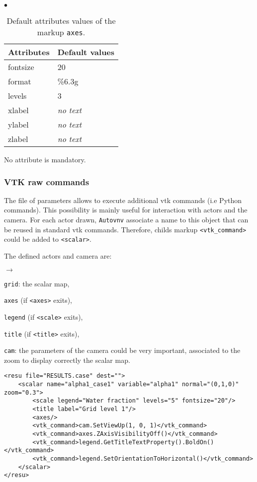 \documentclass[a4paper,10pt,twoside]{csshortdoc}
\begin{document}
\begin{list}{$\bullet$}{}
\begin{table}[htbp]
\begin{center}
\begin{tabular}{|l|l|}
\hline
\textbf{Attributes} & \textbf{Default values} \\
\hline
fontsize & 20 \\
format & \%6.3g \\
levels & 3 \\
xlabel & \textit{no text} \\
ylabel & \textit{no text} \\
zlabel & \textit{no text} \\
\hline
\end{tabular}
\end{center}
\caption{Default attributes values of the markup \texttt{axes}.}
\label{table:axes}
\end{table}

No attribute is mandatory.

\end{list}

\subsubsection{VTK raw commands}\label{sec:raw_vtk}

The file of parameters allows to execute additional vtk commands (i.e Python
commands). This possibility is mainly useful for interaction with actors and the
camera. For each actor drawn, \texttt{Autovnv} associate a name to this object
that can be reused in standard vtk commands. Therefore, childs markup
\texttt{<vtk\_command>} could be added to \texttt{<scalar>}.

The defined actors and camera are:
\begin{list}{$\rightarrow$}{}
\item \texttt{grid}: the scalar map,
\item \texttt{axes} (if \texttt{<axes>} exits),
\item \texttt{legend} (if \texttt{<scale>} exits),
\item \texttt{title} (if \texttt{<title>} exits),
\item \texttt{cam}: the parameters of the camera could be very important,
associated to the zoom to display correctly the scalar map.
\end{list}

\small
\begin{verbatim}
<resu file="RESULTS.case" dest="">
    <scalar name="alpha1_case1" variable="alpha1" normal="(0,1,0)" zoom="0.3">
        <scale legend="Water fraction" levels="5" fontsize="20"/>
        <title label="Grid level 1"/>
        <axes/>
        <vtk_command>cam.SetViewUp(1, 0, 1)</vtk_command>
        <vtk_command>axes.ZAxisVisibilityOff()</vtk_command>
        <vtk_command>legend.GetTitleTextProperty().BoldOn()</vtk_command>
        <vtk_command>legend.SetOrientationToHorizontal()</vtk_command>
    </scalar>
</resu>
\end{verbatim}
\normalsize
\end{document}
